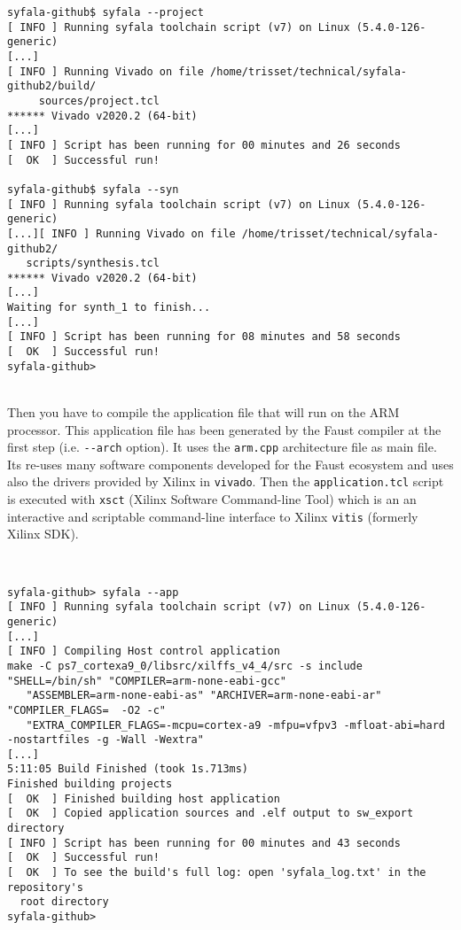 \begin{boxedminipage}{\textwidth}
  \small
\begin{verbatim}
syfala-github$ syfala --project
[ INFO ] Running syfala toolchain script (v7) on Linux (5.4.0-126-generic)
[...]
[ INFO ] Running Vivado on file /home/trisset/technical/syfala-github2/build/
     sources/project.tcl
****** Vivado v2020.2 (64-bit)
[...]
[ INFO ] Script has been running for 00 minutes and 26 seconds
[  OK  ] Successful run!

syfala-github$ syfala --syn
[ INFO ] Running syfala toolchain script (v7) on Linux (5.4.0-126-generic)
[...][ INFO ] Running Vivado on file /home/trisset/technical/syfala-github2/
   scripts/synthesis.tcl
****** Vivado v2020.2 (64-bit)
[...]
Waiting for synth_1 to finish...
[...]
[ INFO ] Script has been running for 08 minutes and 58 seconds
[  OK  ] Successful run!
syfala-github>
\end{verbatim}
\end{boxedminipage}
~\\

Then you have to compile the application file that will run on the ARM processor. This application file has been generated by the Faust compiler at the first step (i.e. \verb#--arch# option). It uses  the {\tt arm.cpp} architecture file as main file. Its re-uses many software components developed for the Faust ecosystem and uses also the drivers provided by Xilinx in {\tt vivado}. Then the {\tt application.tcl} script is executed with {\tt xsct} (Xilinx Software Command-line Tool) which is an an interactive and scriptable command-line interface to Xilinx {\tt vitis} (formerly Xilinx SDK).

~\\
\begin{boxedminipage}{1.01\textwidth}
  \small
\begin{lstlisting}
syfala-github> syfala --app
[ INFO ] Running syfala toolchain script (v7) on Linux (5.4.0-126-generic)
[...]
[ INFO ] Compiling Host control application
make -C ps7_cortexa9_0/libsrc/xilffs_v4_4/src -s include  "SHELL=/bin/sh" "COMPILER=arm-none-eabi-gcc"
   "ASSEMBLER=arm-none-eabi-as" "ARCHIVER=arm-none-eabi-ar" "COMPILER_FLAGS=  -O2 -c"
   "EXTRA_COMPILER_FLAGS=-mcpu=cortex-a9 -mfpu=vfpv3 -mfloat-abi=hard -nostartfiles -g -Wall -Wextra"
[...]
5:11:05 Build Finished (took 1s.713ms)
Finished building projects
[  OK  ] Finished building host application
[  OK  ] Copied application sources and .elf output to sw_export directory
[ INFO ] Script has been running for 00 minutes and 43 seconds
[  OK  ] Successful run!
[  OK  ] To see the build's full log: open 'syfala_log.txt' in the repository's
  root directory
syfala-github>
\end{lstlisting}
\end{boxedminipage}
~\\

